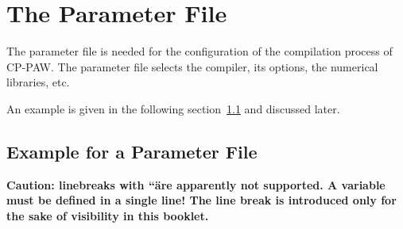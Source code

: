 \documentclass[a4paper,10pt]{report}
\begin{document}
\chapter{The Parameter File}
\label{sec:parmfile}

The parameter file is needed for the configuration of the compilation
process of CP-PAW. The parameter file selects the compiler, its
options, the numerical libraries, etc. 

An example is given in the following
section~\ref{sec:parms.example} and discussed later.

\section{Example for a Parameter File}
\label{sec:parms.example}

\textbf{Caution: linebreaks with ``\" are apparently not supported. A
  variable must be defined in a single line! The line break is
  introduced only for the sake of visibility in this booklet.}
\end{document}
